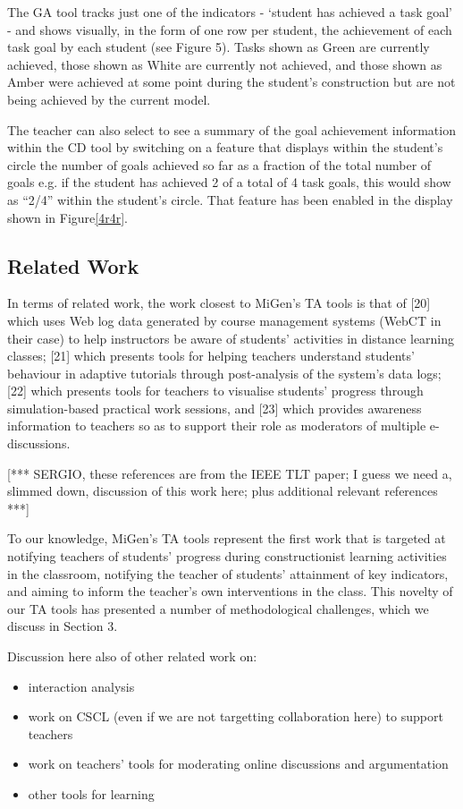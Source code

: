 The GA tool tracks just one of the indicators - `student has achieved
a task goal' - and shows visually, in the form of one row per student,
the achievement of each task goal by each student (see Figure
5). Tasks shown as Green are currently achieved, those shown as White
are currently not achieved, and those shown as Amber were achieved at
some point during the student’s construction but are not being
achieved by the current model.

The teacher can also select to see a summary of the goal achievement
information within the CD tool by switching on a feature that displays
within the student’s circle the number of goals achieved so far as a
fraction of the total number of goals e.g. if the student has achieved
2 of a total of 4 task goals, this would show as “2/4” within the
student’s circle. That feature has been enabled in the display shown
in Figure\ref{4r4r}. 

\subsection{Related Work}
\label{sec:related}

In terms of related work, the work closest to MiGen’s TA tools is that
of [20] which uses Web log data generated by course management systems
(WebCT in their case) to help instructors be aware of students’
activities in distance learning classes; [21] which presents tools for
helping teachers understand students’ behaviour in adaptive tutorials
through post-analysis of the system’s data logs; [22] which presents
tools for teachers to visualise students’ progress through
simulation-based practical work sessions, and [23] which provides
awareness information to teachers so as to support their role as
moderators of multiple e-discussions.  

[*** SERGIO, these references are from the IEEE TLT paper; I guess we
need a, slimmed down, discussion of this work here; plus additional
relevant references ***] 
 
To our knowledge, MiGen’s TA tools represent the first work that is
targeted at notifying teachers of students’ progress during
constructionist learning activities in the classroom, notifying the
teacher of students’ attainment of key indicators, and aiming to
inform the teacher’s own interventions in the class. This novelty of
our TA tools has presented a number of methodological challenges,
which we discuss in Section 3.  

Discussion here also of other related work on: 
\begin{itemize}
\item  interaction analysis
\item  work on CSCL (even if we are not targetting collaboration here)
  to support teachers 
\item  work on teachers’ tools for moderating online discussions and
  argumentation 
\item  other tools for learning
\end{itemize}


